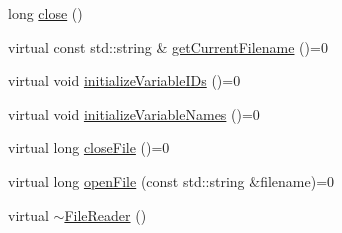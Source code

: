 \begin{DoxyCompactItemize}
\item 
long \hyperlink{classccmc_1_1_file_reader_a036ac2d85ad32a98b81c9e6ebf0ef133}{close} ()
\item 
virtual const std\-::string \& \hyperlink{classccmc_1_1_file_reader_a9f266e85464a71985e6c922ba508aa9e}{get\-Current\-Filename} ()=0
\item 
virtual void \hyperlink{classccmc_1_1_file_reader_a2663bad21fc69c24f555b27d1cc2b8c8}{initialize\-Variable\-I\-Ds} ()=0
\item 
virtual void \hyperlink{classccmc_1_1_file_reader_a3517b66817277210916f6e5aa3db21a8}{initialize\-Variable\-Names} ()=0
\item 
virtual long \hyperlink{classccmc_1_1_file_reader_aa9b2ff7591f3d3f40ceb0007acbbe3ca}{close\-File} ()=0
\item 
virtual long \hyperlink{classccmc_1_1_file_reader_aa4afaba431365ecd756641e479140768}{open\-File} (const std\-::string \&filename)=0
\item 
virtual \hyperlink{classccmc_1_1_file_reader_a83d4e886090a2ef02d3fcc799fe2d349}{$\sim$\-File\-Reader} ()
\end{DoxyCompactItemize}
